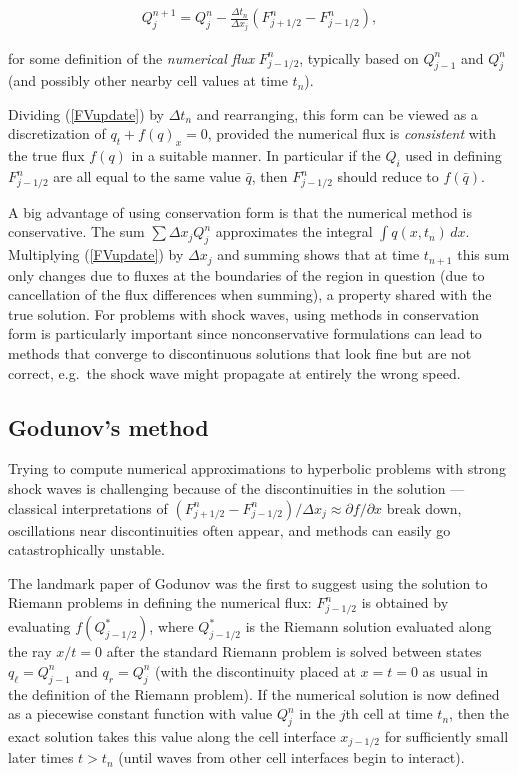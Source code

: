 \documentclass{SIAMbook2016}
\begin{document}
\begin{align}\label{FVupdate}
Q_j^{n+1} = Q_j^n - \frac{\Delta t_n}{\Delta x_j} (F_{j+1/2}^n - F_{j-1/2}^n),
\end{align}

for some definition of the \emph{numerical flux} \(F_{j-1/2}^n\),
typically based on \(Q_{j-1}^n\) and \(Q_j^n\) (and possibly other
nearby cell values at time \(t_n\)).

Dividing (\ref{FVupdate}) by \(\Delta t_n\) and rearranging, this form
can be viewed as a discretization of \(q_t + f(q)_x = 0\), provided the
numerical flux is \emph{consistent} with the true flux \(f(q)\) in a
suitable manner. In particular if the \(Q_i\) used in defining
\(F_{j-1/2}^n\) are all equal to the same value \(\bar q\), then
\(F_{j-1/2}^n\) should reduce to \(f(\bar q)\).

A big advantage of using conservation form is that the numerical method
is conservative. The sum \(\sum \Delta x_j Q_j^n\) approximates the
integral \(\int q(x,t_n)\,dx\). Multiplying (\ref{FVupdate}) by
\(\Delta x_j\) and summing shows that at time \(t_{n+1}\) this sum only
changes due to fluxes at the boundaries of the region in question (due
to cancellation of the flux differences when summing), a property shared
with the true solution. For problems with shock waves, using methods in
conservation form is particularly important since nonconservative
formulations can lead to methods that converge to discontinuous
solutions that look fine but are not correct, e.g.~the shock wave might
propagate at entirely the wrong speed.

\hypertarget{godunovs-method}{%
\subsection{Godunov's method}\label{godunovs-method}}

Trying to compute numerical approximations to hyperbolic problems with
strong shock waves is challenging because of the discontinuities in the
solution --- classical interpretations of
\((F_{j+1/2}^n - F_{j-1/2}^n)/\Delta x_j \approx \partial f/ \partial x\)
break down, oscillations near discontinuities often appear, and methods
can easily go catastrophically unstable.

The landmark paper of Godunov \cite{godunov} was the first to suggest
using the solution to Riemann problems in defining the numerical flux:
\(F_{j-1/2}^n\) is obtained by evaluating \(f(Q_{j-1/2}^*)\), where
\(Q_{j-1/2}^*\) is the Riemann solution evaluated along the ray
\(x/t = 0\) after the standard Riemann problem is solved between states
\(q_\ell=Q_{j-1}^n\) and \(q_r=Q_j^n\) (with the discontinuity placed at
\(x=t=0\) as usual in the definition of the Riemann problem). If the
numerical solution is now defined as a piecewise constant function with
value \(Q_j^n\) in the \(j\)th cell at time \(t_n\), then the exact
solution takes this value along the cell interface \(x_{j-1/2}\) for
sufficiently small later times \(t > t_n\) (until waves from other cell
interfaces begin to interact).
\end{document}

